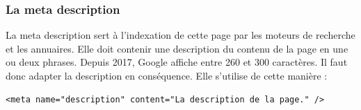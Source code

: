 \documentclass[a4paper]{article}
\begin{document}
\subsubsection{La {\color{monOrange}meta description}}
La {\color{monOrange}meta} description sert à l'indexation de cette page par les moteurs de recherche et les annuaires. Elle doit contenir une description du contenu de la page en une ou deux phrases. Depuis 2017, Google affiche entre 260 et 300 caractères. Il faut donc adapter la description en conséquence. Elle s'utilise de cette manière :
\begin{verbatim}
<meta name="description" content="La description de la page." />
\end{verbatim}
\end{document}
